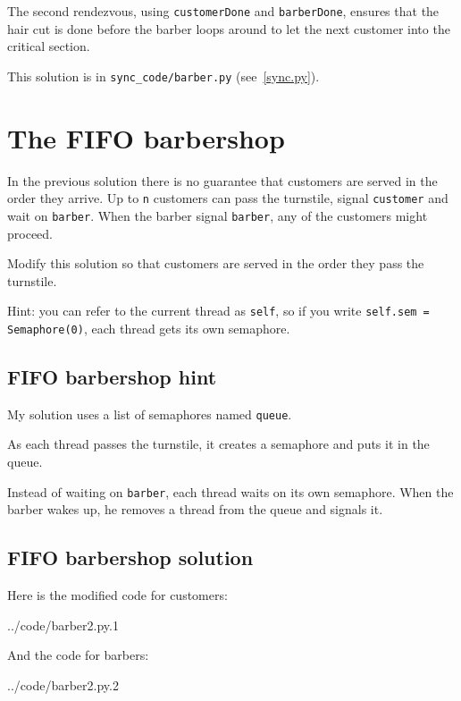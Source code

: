 \documentclass{book}
\newcommand{\clearemptydoublepage}{\newpage\cleardoublepage}
\begin{document}
The second rendezvous, using {\tt customerDone} and {\tt barberDone},
ensures that the hair cut is done before the barber loops around to
let the next customer into the critical section.

This solution is in \verb"sync_code/barber.py" (see~\ref{sync.py}).


\clearemptydoublepage
\section{The FIFO barbershop}

In the previous solution there is no guarantee that customers are
served in the order they arrive.  Up to {\tt n} customers can pass
the turnstile, signal
{\tt customer} and wait on {\tt barber}.  When the barber signal
{\tt barber}, any of the customers might proceed.

Modify this solution so that customers are served in the order they
pass the turnstile.

Hint: you can refer to the current thread as {\tt self}, so if you
write {\tt self.sem = Semaphore(0)}, each thread gets its own
semaphore.


\clearemptydoublepage
\subsection{FIFO barbershop hint}

My solution uses a list of semaphores named {\tt queue}.



As each thread passes the turnstile, it creates a semaphore and puts it
in the queue.

Instead of waiting on {\tt barber}, each thread waits on its own
semaphore.  When the barber wakes up, he removes a thread from the queue and
signals it.


\clearemptydoublepage
\subsection{FIFO barbershop solution}

Here is the modified code for customers:


{../code/barber2.py.1}

And the code for barbers:


{../code/barber2.py.2}
\end{document}
